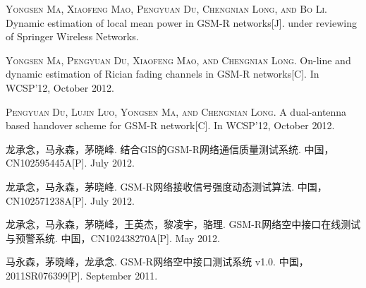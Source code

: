 
\begin{publications}{99}

    \item\textsc{Yongsen Ma, Xiaofeng Mao, Pengyuan Du, Chengnian Long, and Bo Li}. {Dynamic estimation of local mean power in GSM-R networks}[J]. under reviewing of Springer Wireless Networks.


    \item\textsc{Yongsen Ma, Pengyuan Du, Xiaofeng Mao, and Chengnian Long}. {On-line and dynamic estimation of Rician fading channels in GSM-R networks}[C]. In WCSP’12, October 2012.

    \item\textsc{Pengyuan Du, Lujin Luo, Yongsen Ma, and Chengnian Long}. {A dual-antenna based handover scheme for GSM-R network}[C]. In WCSP’12, October 2012.

    \item\textsc{龙承念，马永森，茅晓峰}. {结合GIS的GSM-R网络通信质量测试系统}. {中国，CN102595445A}[P]. July 2012.

    \item\textsc{龙承念，马永森，茅晓峰}. {GSM-R网络接收信号强度动态测试算法}. {中国，CN102571238A}[P]. July 2012.

    \item\textsc{龙承念，马永森，茅晓峰，王英杰，黎凌宇，骆理}. {GSM-R网络空中接口在线测试与预警系统}. {中国，CN102438270A}[P]. May 2012.

    \item\textsc{马永森，茅晓峰，龙承念}. {GSM-R网络空中接口测试系统 v1.0}. {中国，2011SR076399}[P]. September 2011.
\end{publications}
